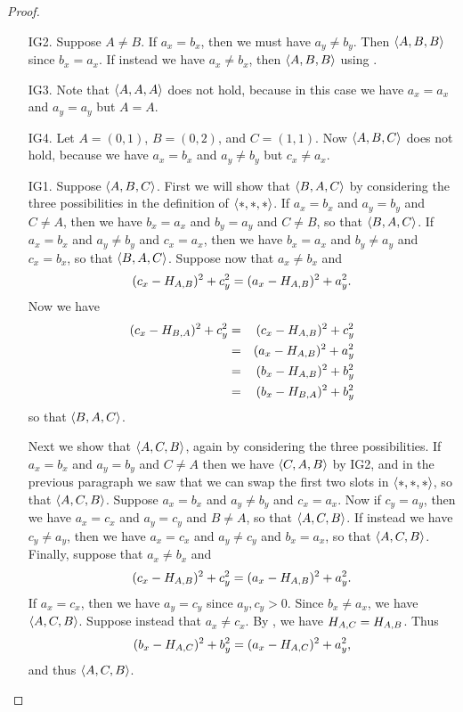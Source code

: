\begin{proof}\mbox{}
\begin{itemize}
\item[IG2.] Suppose \(A \neq B\).
If \(a_x = b_x\), then we must have \(a_y \neq b_y\).
Then \(\langle A, B, B \rangle\) since \(b_x = a_x\).
If instead we have \(a_x \neq b_x\), then \(\langle A, B, B \rangle\) using .

\item[IG3.] Note that \(\langle A, A, A \rangle\) does not hold, because in this case we have \(a_x = a_x\) and \(a_y = a_y\) but \(A = A\).

\item[IG4.] Let \(A = (0,1)\), \(B = (0,2)\), and \(C = (1,1)\).
Now \(\langle A, B, C \rangle\) does not hold, because we have \(a_x = b_x\) and \(a_y \neq b_y\) but \(c_x \neq a_x\).

\item[IG1.] Suppose \(\langle A, B, C \rangle\).
First we will show that \(\langle B, A, C \rangle\) by considering the three possibilities in the definition of \(\langle \ast, \ast, \ast \rangle\).
If \(a_x = b_x\) and \(a_y = b_y\) and \(C \neq A\), then we have \(b_x = a_x\) and \(b_y = a_y\) and \(C \neq B\), so that \(\langle B, A, C \rangle\).
If \(a_x = b_x\) and \(a_y \neq b_y\) and \(c_x = a_x\), then we have \(b_x = a_x\) and \(b_y \neq a_y\) and \(c_x = b_x\), so that \(\langle B, A, C \rangle\).
Suppose now that \(a_x \neq b_x\) and \[ (c_x - H_{A,B})^2 + c_y^2 = (a_x - H_{A,B})^2 + a_y^2. \]
Now we have
\begin{eqnarray*}
(c_x - H_{B,A})^2 + c_y^2
 & = & (c_x - H_{A,B})^2 + c_y^2 \\
 & = & (a_x - H_{A,B})^2 + a_y^2 \\
 & = & (b_x - H_{A,B})^2 + b_y^2 \\
 & = & (b_x - H_{B,A})^2 + b_y^2
\end{eqnarray*}
so that \(\langle B, A, C \rangle\).

Next we show that \(\langle A, C, B \rangle\), again by considering the three possibilities.
If \(a_x = b_x\) and \(a_y = b_y\) and \(C \neq A\) then we have \(\langle C, A, B \rangle\) by IG2, and in the previous paragraph we saw that we can swap the first two slots in \(\langle \ast, \ast, \ast \rangle\), so that \(\langle A, C, B \rangle\).
Suppose \(a_x = b_x\) and \(a_y \neq b_y\) and \(c_x = a_x\).
Now if \(c_y = a_y\), then we have \(a_x = c_x\) and \(a_y = c_y\) and \(B \neq A\), so that \(\langle A, C, B \rangle\).
If instead we have \(c_y \neq a_y\), then we have \(a_x = c_x\) and \(a_y \neq c_y\) and \(b_x = a_x\), so that \(\langle A, C, B \rangle\).
Finally, suppose that \(a_x \neq b_x\) and \[ (c_x - H_{A,B})^2 + c_y^2 = (a_x - H_{A,B})^2 + a_y^2. \]
If \(a_x = c_x\), then we have \(a_y = c_y\) since \(a_y, c_y > 0\).
Since \(b_x \neq a_x\), we have \(\langle A, C, B \rangle\).
Suppose instead that \(a_x \neq c_x\).
By , we have \(H_{A,C} = H_{A,B}\).
Thus \[ (b_x - H_{A,C})^2 + b_y^2 = (a_x - H_{A,C})^2 + a_y^2, \] and thus \(\langle A, C, B \rangle\).


\end{itemize}
\end{proof}
